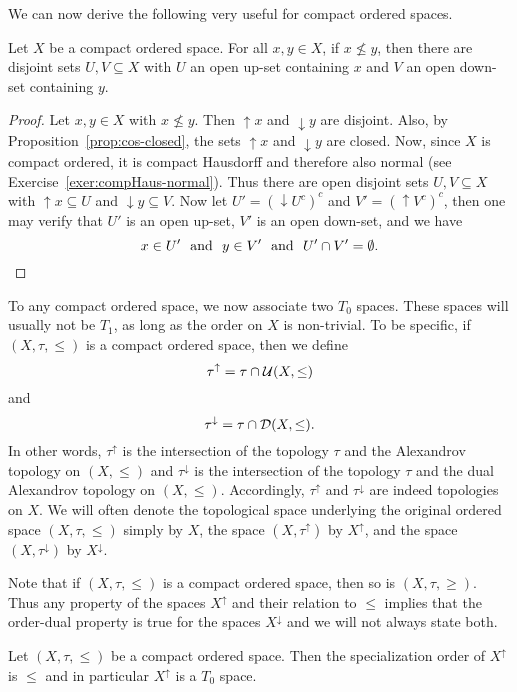 We can now derive the following very useful  for compact ordered spaces.

\begin{proposition}\label{prop:cos-ordsep}
Let $X$ be a compact ordered space. For all $x,y\in X$, if $x\nleq y$, then there are disjoint sets $U,V\subseteq X$ with $U$ an open up-set containing $x$ and $V$ an open down-set containing $y$.
\end{proposition}

\begin{proof}
Let $x,y\in X$ with $x\nleq y$. Then ${\uparrow}x$ and ${\downarrow} y$ are disjoint. Also, by Proposition~\ref{prop:cos-closed}, the sets ${\uparrow}x$ and ${\downarrow} y$ are closed. Now, since $X$ is compact ordered, it is compact Hausdorff and therefore also normal (see Exercise~\ref{exer:compHaus-normal}).  Thus there are open disjoint sets $U,V\subseteq X$ with ${\uparrow}x\subseteq U$ and ${\downarrow} y\subseteq V$. Now let $U'=({\downarrow}U^c)^c$ and $V'=({\uparrow}V^c)^c$, then one may verify that $U'$ is an open up-set, $V'$ is an open down-set, and we have
\[
x\in U' \ \text{ and }\ y\in V' \ \text{ and }\ U'\cap V'=\emptyset.\qedhere
\]
\end{proof}
To any compact ordered space, we now associate two $T_0$ spaces. These spaces will usually not be $T_1$, as long as the order on $X$ is non-trivial. To be specific, if $(X,\tau,\leq)$ is a compact ordered space, then we define
\[
\tau^{\uparrow}=\tau\cap \mathcal{U}(X,\leq)
\]
and
\[
\tau^{\downarrow}=\tau\cap \mathcal{D}(X,\leq).
\]
In other words, $\tau^{\uparrow}$ is the intersection of the topology $\tau$ and the Alexandrov topology on $(X,\leq)$ and $\tau^{\downarrow}$ is the intersection of the topology $\tau$ and the dual Alexandrov topology on $(X,\leq)$. Accordingly, $\tau^{\uparrow}$  and $\tau^{\downarrow}$ are indeed topologies on $X$. We will often denote the topological space underlying the original ordered space $(X,\tau, \leq)$ simply by $X$, the space $(X,\tau^{\uparrow})$ by $X^{\uparrow}$, and the space $(X,\tau^{\downarrow})$ by $X^{\downarrow}$.

Note that if $(X,\tau,\leq)$ is a compact ordered space, then so is $(X,\tau,\geq)$. Thus any property of the spaces $X^{\uparrow}$ and their relation to $\leq$ implies that the order-dual property is true for the spaces $X^{\downarrow}$ and we will not always state both.

\begin{proposition}\label{prop:compord-specord}
Let $(X,\tau,\leq)$ be a compact ordered space. Then the specialization order of $X^{\uparrow}$ is $\leq$ and in particular $X^{\uparrow}$ is a $T_0$ space.
\end{proposition}

